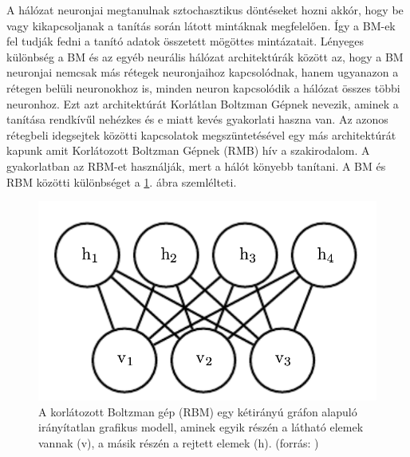 

A hálózat neuronjai megtanulnak sztochasztikus döntéseket hozni akkór, hogy be vagy kikapcsoljanak a tanítás során látott mintáknak megfelelően. Így a BM-ek fel tudják fedni a tanító adatok összetett mögöttes mintázatait. Lényeges különbség a BM és az egyéb neurális hálózat architektúrák között az, hogy a BM neuronjai nemcsak más rétegek neuronjaihoz kapcsolódnak, hanem ugyanazon a rétegen belüli neuronokhoz is, minden neuron kapcsolódik a hálózat összes többi neuronhoz. Ezt azt architektúrát Korlátlan Boltzman Gépnek nevezik, aminek a tanítása rendkívűl nehézkes és e miatt kevés gyakorlati haszna van. Az azonos rétegbeli idegsejtek közötti kapcsolatok megszüntetésével egy más architektúrát kapunk amit Korlátozott Boltzman Gépnek (RMB) hív a szakirodalom. A gyakorlatban az RBM-et használják, mert a hálót könyebb tanítani. A BM és RBM közötti különbséget a \ref{fig:bm}. ábra szemlélteti.

\begin{figure}[ht]
	\centering
	\includegraphics[width=0.50\columnwidth]{figures/RBM.png}
	\caption{A korlátozott Boltzman gép (RBM) egy kétirányú gráfon alapuló irányítatlan grafikus modell, aminek egyik részén a látható elemek vannak (v), a másik részén a rejtett elemek (h). (forrás: \cite{fig:RMB})}
	\label{fig:bm}
\end{figure}

